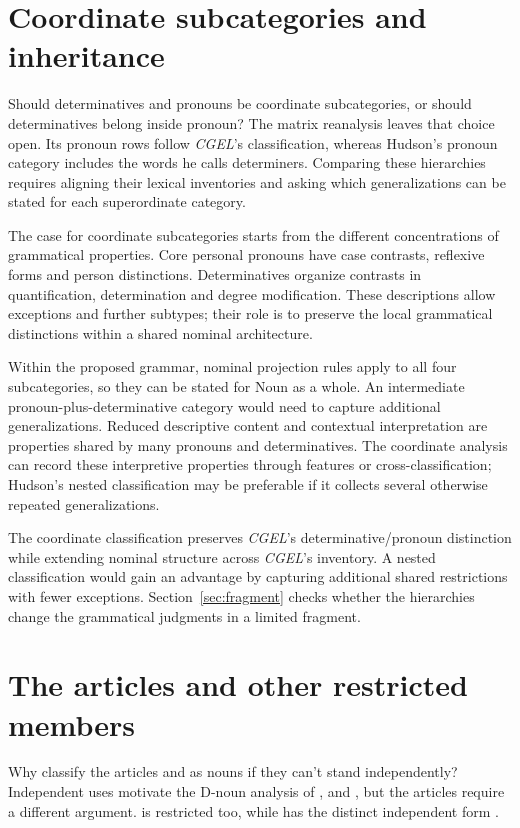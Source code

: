 \documentclass[12pt]{article}
\begin{document}
\section{Coordinate subcategories and inheritance}\label{sec:inheritance}

Should determinatives and pronouns be coordinate subcategories, or should determinatives belong inside pronoun? The matrix reanalysis leaves that choice open. Its pronoun rows follow \textit{CGEL}'s classification, whereas Hudson's pronoun category includes the words he calls determiners. Comparing these hierarchies requires aligning their lexical inventories and asking which generalizations can be stated for each superordinate category.

The case for coordinate subcategories starts from the different concentrations of grammatical properties. Core personal pronouns have case contrasts, reflexive forms and person distinctions. Determinatives organize contrasts in quantification, determination and degree modification. These descriptions allow exceptions and further subtypes; their role is to preserve the local grammatical distinctions within a shared nominal architecture.

Within the proposed grammar, nominal projection rules apply to all four subcategories, so they can be stated for Noun as a whole. An intermediate pronoun-plus-determinative category would need to capture additional generalizations. Reduced descriptive content and contextual interpretation are properties shared by many pronouns and determinatives. The coordinate analysis can record these interpretive properties through features or cross-classification; Hudson's nested classification may be preferable if it collects several otherwise repeated generalizations.

The coordinate classification preserves \textit{CGEL}'s determinative/pronoun distinction while extending nominal structure across \textit{CGEL}'s inventory. A nested classification would gain an advantage by capturing additional shared restrictions with fewer exceptions. Section~\ref{sec:fragment} checks whether the hierarchies change the grammatical judgments in a limited fragment.

\section{The articles and other restricted members}\label{sec:articles}

Why classify the articles  and  as nouns if they can't stand independently? Independent uses motivate the D-noun analysis of ,  and , but the articles require a different argument.  is restricted too, while  has the distinct independent form  \citep[371--372, 410--411]{huddleston2002}.
\end{document}
